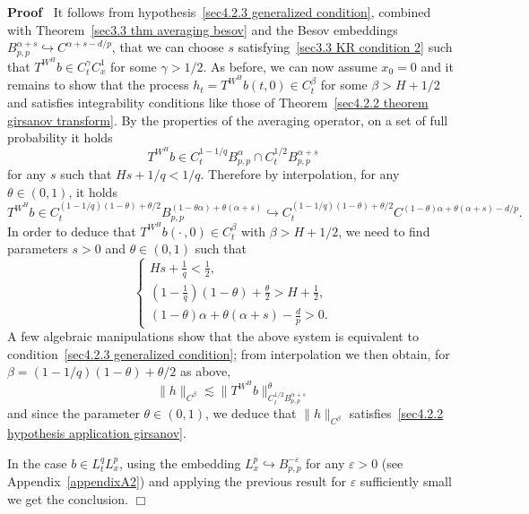 \documentclass[10pt]{article}
\newenvironment{proof}{\noindent\textbf{Proof\ }}{\hspace*{\fill}$\Box$\medskip}
\begin{document}
\begin{proof}
  It follows from hypothesis~{\eqref{sec4.2.3 generalized condition}},
  combined with Theorem~\ref{sec3.3 thm averaging besov} and the Besov
  embeddings $B^{\alpha + s}_{p, p} \hookrightarrow C^{\alpha + s - d / p}$,
  that we can choose $s$ satisfying~{\eqref{sec3.3 KR condition 2}} such that
  $T^{W^H} b \in C^{\gamma}_t C^1_x$ for some $\gamma > 1 / 2$. As before, we
  can now assume $x_0 = 0$ and it remains to show that the process $h_t =
  T^{W^H} b (t, 0) \in C^{\beta}_t$ for some $\beta > H + 1 / 2$ and satisfies
  integrability conditions like those of Theorem~\ref{sec4.2.2 theorem
  girsanov transform}. By the properties of the averaging operator, on a set
  of full probability it holds
  \[ T^{W^H} b \in C^{1 - 1 / q}_t B^{\alpha}_{p, p} \cap C^{1 / 2}_t
     B^{\alpha + s}_{p, p} \]
  for any $s$ such that $H s + 1 / q < 1 / q$. Therefore by interpolation, for
  any $\theta \in (0, 1)$, it holds
  \[ T^{W^H} b \in C^{(1 - 1 / q) (1 - \theta) + \theta / 2}_t B^{(1 - \theta
     \alpha) + \theta (\alpha + s)}_{p, p} \hookrightarrow C^{(1 - 1 / q) (1 -
     \theta) + \theta / 2}_t C^{(1 - \theta) \alpha + \theta (\alpha + s) - d
     / p} . \]
  In order to deduce that $T^{W^H} b \left( \cdot \,, 0 \right) \in
  C^{\beta}_t$ with $\beta > H + 1 / 2$, we need to find parameters $s > 0$
  and $\theta \in (0, 1)$ such that
  \[ \left\{\begin{array}{l}
       H s + \frac{1}{q} < \frac{1}{2},\\
       \left( 1 - \frac{1}{q} \right) (1 - \theta) + \frac{\theta}{2} > H +
       \frac{1}{2},\\
       (1 - \theta) \alpha + \theta (\alpha + s) - \frac{d}{p} > 0.
     \end{array}\right. \]
  A few algebraic manipulations show that the above system is equivalent to
  condition~{\eqref{sec4.2.3 generalized condition}}; from interpolation we
  then obtain, for $\beta = (1 - 1 / q) (1 - \theta) + \theta / 2$ as above,
  \[ \| h \|_{C^{\beta}} \lesssim \| T^{W^H} b \|_{C^{1 / 2}_t B^{\alpha +
     s}_{p, p}}^{\theta} \]
  and since the parameter $\theta \in (0, 1)$, we deduce that $\| h
  \|_{C^{\beta}}$ satisfies~{\eqref{sec4.2.2 hypothesis application
  girsanov}}.
  
  In the case $b \in L^q_t L^p_x$, using the embedding $L^p_x \hookrightarrow
  B^{- \varepsilon}_{p, p}$ for any $\varepsilon > 0$ (see
  Appendix~\ref{appendixA2}) and applying the previous result for
  $\varepsilon$ sufficiently small we get the conclusion.
\end{proof}
\end{document}
